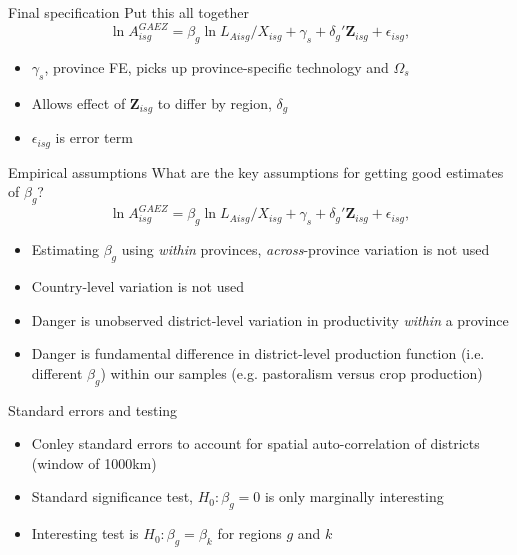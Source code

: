 \documentclass[10pt, xcolor=dvipsnames]{beamer}
\begin{document}
\begin{frame}{Final specification}
Put this all together 
\begin{equation}
  \ln A^{GAEZ}_{isg} = \beta_g \ln L_{Aisg}/X_{isg} + \gamma_{s} + \delta_g' \mathbf{Z}_{isg} + \epsilon_{isg}, \label{EQ_regress}
\end{equation}

\begin{itemize}
  \item $\gamma_{s}$, province FE, picks up province-specific technology and $\Omega_s$
  \item Allows effect of $\mathbf{Z}_{isg}$ to differ by region, $\delta_g$
  \item $\epsilon_{isg}$ is error term
\end{itemize}
\end{frame}

\begin{frame}{Empirical assumptions}
What are the key assumptions for getting good estimates of $\beta_g$?
\begin{equation}
  \ln A^{GAEZ}_{isg} = \beta_g \ln L_{Aisg}/X_{isg} + \gamma_{s} + \delta_g' \mathbf{Z}_{isg} + \epsilon_{isg}, \label{EQ_regress}
\end{equation}

\begin{itemize}
  \item Estimating $\beta_g$ using \textit{within} provinces, \textit{across}-province variation is not used
  \item Country-level variation is not used
  \item Danger is unobserved district-level variation in productivity \textit{within} a province
  \item Danger is fundamental difference in district-level production function (i.e. different $\beta_g$) within our samples (e.g. pastoralism versus crop production)
\end{itemize}
\end{frame}

\begin{frame}{Standard errors and testing}\label{testing}
\begin{itemize}
  \item Conley standard errors to account for spatial auto-correlation of districts (window of 1000km)
  \item Standard significance test, $H_0: \beta_g = 0$ is only marginally interesting
  \item Interesting test is $H_0: \beta_{g} = \beta_{k}$ for regions $g$ and $k$ 
\end{itemize}

\hfill \hyperlink{interaction}{}
\end{frame}
\end{document}
